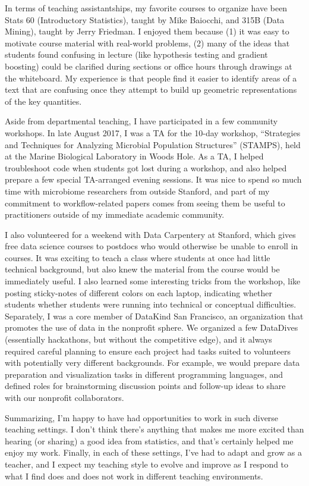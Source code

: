 \documentclass{article}
\begin{document}
In terms of teaching assistantships, my favorite courses to organize have been
Stats 60 (Introductory Statistics), taught by Mike Baiocchi, and 315B (Data
Mining), taught by Jerry Friedman. I enjoyed them because (1) it was easy to
motivate course material with real-world problems, (2) many of the ideas that
students found confusing in lecture (like hypothesis testing and gradient
boosting) could be clarified during sections or office hours through drawings at
the whiteboard. My experience is that people find it easier to identify areas of
a text that are confusing once they attempt to build up geometric
representations of the key quantities.

Aside from departmental teaching, I have participated in a few community
workshops. In late August 2017, I was a TA for the 10-day workshop, ``Strategies
and Techniques for Analyzing Microbial Population Structures'' (STAMPS), held at
the Marine Biological Laboratory in Woods Hole. As a TA, I helped troubleshoot
code when students got lost during a workshop, and also helped prepare a few
special TA-arranged evening sessions. It was nice to spend so much time with
microbiome researchers from outside Stanford, and part of my commitment to
workflow-related papers comes from seeing them be useful to practitioners
outside of my immediate academic community.

I also volunteered for a weekend with Data Carpentery at Stanford, which gives
free data science courses to postdocs who would otherwise be unable to enroll in
courses. It was exciting to teach a class where students at once had little
technical background, but also knew the material from the course would be
immediately useful. I also learned some interesting tricks from the workshop,
like posting sticky-notes of different colors on each laptop, indicating whether
students whether students were running into technical or conceptual
difficulties. Separately, I was a core member of DataKind San Francisco, an
organization that promotes the use of data in the nonprofit sphere. We organized
a few DataDives (essentially hackathons, but without the competitive edge), and
it always required careful planning to ensure each project had tasks suited to
volunteers with potentially very different backgrounds. For example, we would
prepare data preparation and visualization tasks in different programming
languages, and defined roles for brainstorming discussion points and follow-up
ideas to share with our nonprofit collaborators.

Summarizing, I'm happy to have had opportunities to work in such diverse
teaching settings. I don't think there's anything that makes me more excited
than hearing (or sharing) a good idea from statistics, and that's certainly
helped me enjoy my work. Finally, in each of these settings, I've had to adapt
and grow as a teacher, and I expect my teaching style to evolve and improve as I
respond to what I find does and does not work in different teaching
environments.
\end{document}
